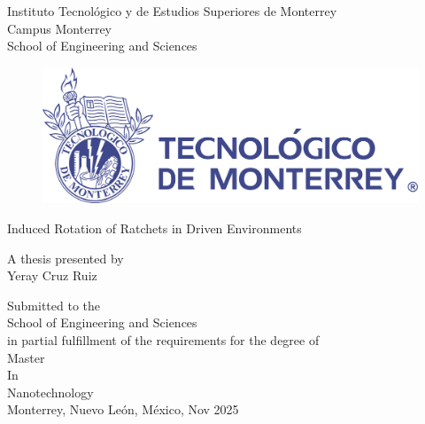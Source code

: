 \thispagestyle{empty} %

\begin{center}
\large { Instituto Tecnológico y de Estudios Superiores de Monterrey\\}
\vspace*{0.5em}
\normalsize { Campus Monterrey } \\
\vspace*{0.5em}
\large{School of Engineering and Sciences\\}
\vspace*{1em}

\begin{figure}[!h]
 \begin{center}
  \includegraphics[scale=0.1]{pics/LogoTec.pdf}
 \end{center}
\end{figure}
\vspace*{0.6cm}

\Large {Induced Rotation of Ratchets in Driven Environments}

\vspace*{0.5em}
\normalsize{A thesis presented by}\\
\vspace*{0.5em}
\large{Yeray Cruz Ruiz}\\
\vspace*{1.5cm}
\normalsize

Submitted to the\\
School of Engineering and Sciences\\
in partial fulfillment of the requirements for the degree of\\
\vspace*{1em}
\large{Master} \\
\large{In} \\
\large{Nanotechnology} \\
\normalsize
\vfill
Monterrey, Nuevo León, México, Nov 2025\\
\end{center}

